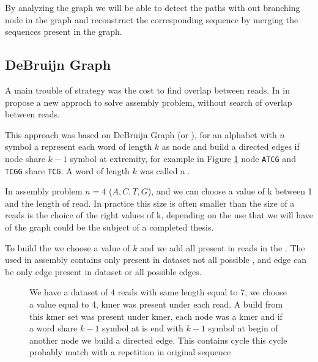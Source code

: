 \documentclass[./main.tex]{subfiles}
\begin{document}
By analyzing the graph we will be able to detect the paths with out branching node in the graph and reconstruct the corresponding sequence by merging the sequences present in the graph.


\subsection{DeBruijn Graph}


A main trouble of \OLC strategy was the cost to find overlap between reads. In \citeauthor{eulerian_approach} in \cite{eulerian_approach} propose a new approch to solve assembly problem, without search of overlap between reads.

This approach was based on DeBruijn Graph (or \DBG), for an alphabet with $n$ symbol a \DBG represent each word of length $k$ as node and build a directed edges if node share $k - 1$ symbol at extremity, for example in Figure \ref{intro:fig:dbg:graph} node \texttt{ATCG} and \texttt{TCGG} share \texttt{TCG}. A word of length $k$ was called a \kmer.

In assembly problem $n = 4$ (${A, C, T, G}$), and we can choose a value of k between 1 and the length of read. In practice this size is often smaller than the size of a reads is the choice of the right values of k, depending on the use that we will have of the \DBG graph could be the subject of a completed thesis.

To build the \DBG we choose a value of $k$ and we add all \kmer present in reads in the \DBG. The \DBG used in assembly contains only \kmer present in dataset not all possible \kmer, and edge can be only edge present in dataset or all possible edges.

\begin{figure}[ht]
    \center
    
    \caption{We have a dataset of 4 reads with same length equal to 7, we choose a value equal to 4, kmer was present under each read. A \DBG build from this kmer set was present under kmer, each node was a kmer and if a word share $k - 1$ symbol at is end with $k - 1$ symbol at begin of another node we build a directed edge. This \DBG contains cycle this cycle probably match with a repetition in original sequence}
    \label{intro:fig:dbg:graph}
\end{figure}
\end{document}
